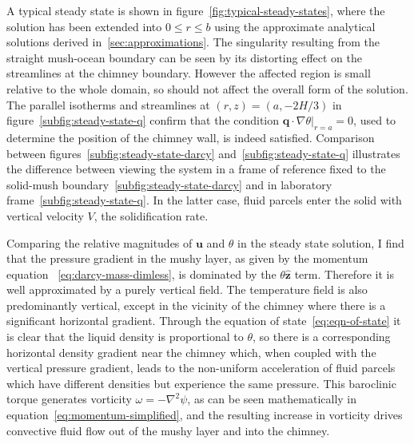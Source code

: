 \documentclass[11pt,twocolumn]{article}
\makeatletter
\newcommand{\specialeqref}[2]{\begingroup
  \def\tagform@##1{\maketag@@@{(\ignorespaces##1\unskip\@@italiccorr#2)}}%
  \eqref{#1}\endgroup}
\makeatother
\begin{document}
A typical steady state is shown in figure~\ref{fig:typical-steady-states}, where the solution has been extended into $0 \le r \le b$ using the approximate analytical solutions derived in~\autoref{sec:approximations}. The singularity resulting from the straight mush-ocean boundary can be seen by its distorting effect on the streamlines at the chimney boundary. However the affected region is small relative to the whole domain, so should not affect the overall form of the solution. The parallel isotherms and streamlines at $(r, z) = (a, -2H/3)$ in figure~\ref{subfig:steady-state-q} confirm that the condition $\left. \mathbf{q} \cdot \nabla \theta \right|_{r=a} = 0$, used to determine the position of the chimney wall, is indeed satisfied. Comparison between figures~\ref{subfig:steady-state-darcy} and~\ref{subfig:steady-state-q} illustrates the difference between viewing the system in a frame of reference fixed to the solid-mush boundary~\ref{subfig:steady-state-darcy} and in laboratory frame~\ref{subfig:steady-state-q}. In the latter case, fluid parcels enter the solid with vertical velocity $V$, the solidification rate.

Comparing the relative magnitudes of $\mathbf{u}$ and $\theta$ in the steady state solution, I find that the pressure gradient in the mushy layer, as given by the momentum equation~\specialeqref{eq:darcy-mass-dimless}{a}, is dominated by the $\theta \mathbf{\hat{z}}$ term. Therefore it is well approximated by a purely vertical field. The temperature field is also predominantly vertical, except in the vicinity of the chimney where there is a significant horizontal gradient. Through the equation of state~\eqref{eq:eqn-of-state} it is clear that the liquid density is proportional to $\theta$, so there is a corresponding horizontal density gradient near the chimney which, when coupled with the vertical pressure gradient, leads to the non-uniform acceleration of fluid parcels which have different densities but experience the same pressure. This baroclinic torque generates vorticity $\omega = - \nabla^2 \psi$, as can be seen mathematically in equation~\eqref{eq:momentum-simplified}, and the resulting increase in vorticity drives convective fluid flow out of the mushy layer and into the chimney.
\end{document}
